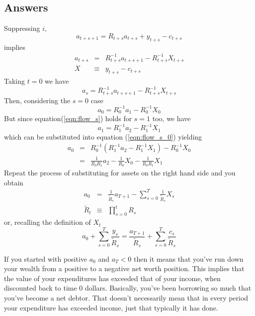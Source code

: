 \documentclass[authoryear,11pt]{elsarticle}
\begin{document}
\subsection*{Answers}
Suppressing $i$,
\begin{equation*}
a_{t+s+1} = R_{t+s} a_{t+s} + y_{t+s} - c_{t+s}
\end{equation*}
implies
\begin{eqnarray*}
a_{t+s} &=& R^{-1}_{t+s} a_{t+s+1} - R^{-1}_{t+s} X_{t+s} \\
X &\equiv& y_{t+s} - c_{t+s}
\end{eqnarray*}
Taking $t=0$ we have
\begin{equation}
a_{s} = R^{-1}_{t+s} a_{t+s+1} - R^{-1}_{t+s} X_{t+s} \label{eqn:flow_s}
\end{equation}
Then, considering the $s=0$ case
\begin{equation}
a_{0} = R^{-1}_{0} a_{1} - R^{-1}_{0} X_{0} \label{eqn:flow_s_0}
\end{equation}
But since equation(\ref{eqn:flow_s}) holds for $s=1$ too, we have
\begin{equation*}
a_{1} = R^{-1}_{1} a_{2} - R^{-1}_{1} X_{1} \label{eqn:flow_s_1}
\end{equation*}
which can be substituted into equation (\ref{eqn:flow_s_0}) yielding
\begin{eqnarray*}
a_{0} 	&=& R^{-1}_{0} (R^{-1}_{1} a_{2} - R^{-1}_{1} X_{1}) - R^{-1}_{0} X_{0} \\
		&=& \frac{1}{R_{0}R_{1}} a_{2} - \frac{1}{R_{0}} X_{0} - \frac{1}{R_{0}R_{1}} X_{1}
\end{eqnarray*}
Repeat the process of substituting for assets on the right hand side and you obtain
\begin{eqnarray*}
a_{0} 	&=& \frac{1}{\tilde{R}_{s}}a_{T+1} - \sum\limits_{s=0}^{T} \frac{1}{\tilde{R}_{s}} X_{s} \\
\tilde{R}_{t}	&\equiv& \prod\limits_{s=0}^{t} R_{s}
\end{eqnarray*}
or, recalling the definition of $X_{t}$
\begin{equation*}
a_{0} + \sum\limits_{s=0}^{T} \frac{y_{s}}{\tilde{R}_{s}}	 = \frac{a_{T+1}}{\tilde{R}_{s}} + \sum\limits_{s=0}^{T} \frac{c_{s}}{\tilde{R}_{s}}
\end{equation*}

If you started with positive $a_{0}$ and $a_{T}<0$ then it means that you've run down your wealth from a positive to a negative net worth position. This implies that the value of your expenditures has exceeded that of your income, when discounted back to time $0$ dollars. Basically, you've been borrowing so much that you've become a net debtor. That doesn't necessarily mean that in every period your expenditure has exceeded income, just that typically it has done.
\end{document}
